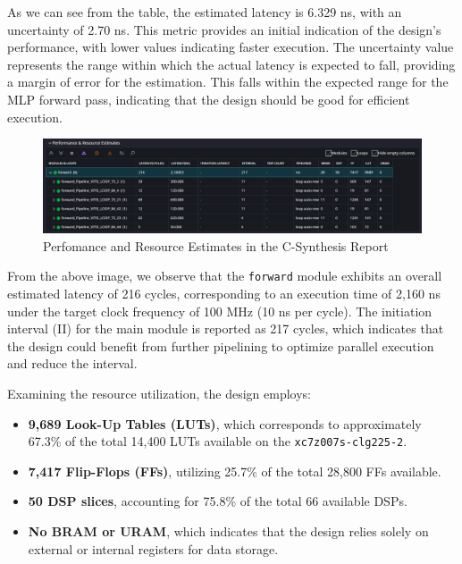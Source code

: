 \documentclass{article}
\begin{document}
As we can see from the table, the estimated latency is 6.329 ns, with an uncertainty of 2.70 ns. This metric provides an initial indication of the design's performance, with lower values indicating faster execution. The uncertainty value represents the range within which the actual latency is expected to fall, providing a margin of error for the estimation. This falls within the expected range for the MLP forward pass, indicating that the design should be good for efficient execution.

\begin{figure}[H]
    \centering
    \includegraphics[width=1\textwidth]{./assets/MLP/c-synthesis-performanceandresourceestimaes.png}
    \caption{Perfomance and Resource Estimates in the C-Synthesis Report}
    \label{fig:c-synthesis-performance-resources}
\end{figure}

From the above image, we observe that the \texttt{forward} module exhibits an overall estimated latency of 216 cycles, corresponding to an execution time of 2,160 ns under the target clock frequency of 100 MHz (10 ns per cycle). The initiation interval (II) for the main module is reported as 217 cycles, which indicates that the design could benefit from further pipelining to optimize parallel execution and reduce the interval.

Examining the resource utilization, the design employs:
\begin{itemize}
    \item \textbf{9,689 Look-Up Tables (LUTs)}, which corresponds to approximately 67.3\% of the total 14,400 LUTs available on the \texttt{xc7z007s-clg225-2}.
    \item \textbf{7,417 Flip-Flops (FFs)}, utilizing 25.7\% of the total 28,800 FFs available.
    \item \textbf{50 DSP slices}, accounting for 75.8\% of the total 66 available DSPs.
    \item \textbf{No BRAM or URAM}, which indicates that the design relies solely on external or internal registers for data storage.
\end{itemize}
\end{document}
